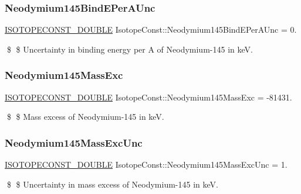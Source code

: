 \subsubsection{\texorpdfstring{Neodymium145\+Bind\+E\+Per\+A\+Unc}{Neodymium145BindEPerAUnc}}
{\footnotesize\ttfamily \mbox{\hyperlink{group___isotope_const-_macros_ga8f45a7272ce02c0b4c65c44636ed719a}{I\+S\+O\+T\+O\+P\+E\+C\+O\+N\+S\+T\+\_\+\+D\+O\+U\+B\+LE}} Isotope\+Const\+::\+Neodymium145\+Bind\+E\+Per\+A\+Unc = 0.}

\$ \$ Uncertainty in binding energy per A of Neodymium-\/145 in keV. \mbox{\label{group___isotope_const-_neodymium-_nd145_ga263ff4abf6090e6b138b972880d0a202}} 
\subsubsection{\texorpdfstring{Neodymium145\+Mass\+Exc}{Neodymium145MassExc}}
{\footnotesize\ttfamily \mbox{\hyperlink{group___isotope_const-_macros_ga8f45a7272ce02c0b4c65c44636ed719a}{I\+S\+O\+T\+O\+P\+E\+C\+O\+N\+S\+T\+\_\+\+D\+O\+U\+B\+LE}} Isotope\+Const\+::\+Neodymium145\+Mass\+Exc = -\/81431.}

\$ \$ Mass excess of Neodymium-\/145 in keV. \mbox{\label{group___isotope_const-_neodymium-_nd145_ga28527dbc444558cd5ea41e02cc759d25}} 
\subsubsection{\texorpdfstring{Neodymium145\+Mass\+Exc\+Unc}{Neodymium145MassExcUnc}}
{\footnotesize\ttfamily \mbox{\hyperlink{group___isotope_const-_macros_ga8f45a7272ce02c0b4c65c44636ed719a}{I\+S\+O\+T\+O\+P\+E\+C\+O\+N\+S\+T\+\_\+\+D\+O\+U\+B\+LE}} Isotope\+Const\+::\+Neodymium145\+Mass\+Exc\+Unc = 1.}

\$ \$ Uncertainty in mass excess of Neodymium-\/145 in keV. \mbox{\label{group___isotope_const-_neodymium-_nd145_ga939a2541d932c9df5996ea246e54b56e}} 
